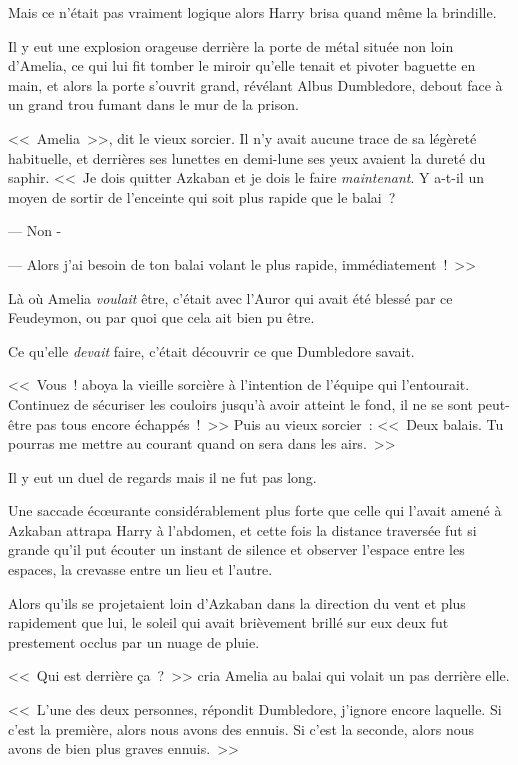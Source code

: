 Mais ce n'était pas vraiment logique alors Harry brisa quand même la brindille.

\later

Il y eut une explosion orageuse derrière la porte de métal située non loin d'Amelia, ce qui lui fit tomber le miroir qu'elle tenait et pivoter baguette en main, et alors la porte s'ouvrit grand, révélant Albus Dumbledore, debout face à un grand trou fumant dans le mur de la prison.

<<~Amelia~>>, dit le vieux sorcier. Il n'y avait aucune trace de sa légèreté habituelle, et derrières ses lunettes en demi-lune ses yeux avaient la dureté du saphir. <<~Je dois quitter Azkaban et je dois le faire \emph{maintenant}. Y a-t-il un moyen de sortir de l'enceinte qui soit plus rapide que le balai~?

--- Non -

--- Alors j'ai besoin de ton balai volant le plus rapide, immédiatement~!~>>

Là où Amelia \emph{voulait} être, c'était avec l'Auror qui avait été blessé par ce Feudeymon, ou par quoi que cela ait bien pu être.

Ce qu'elle \emph{devait} faire, c'était découvrir ce que Dumbledore savait.

<<~Vous~! aboya la vieille sorcière à l'intention de l'équipe qui l'entourait. Continuez de sécuriser les couloirs jusqu'à avoir atteint le fond, il ne se sont peut-être pas tous encore échappés~!~>> Puis au vieux sorcier~: <<~Deux balais. Tu pourras me mettre au courant quand on sera dans les airs.~>>

Il y eut un duel de regards mais il ne fut pas long.

\later

Une saccade écœurante considérablement plus forte que celle qui l'avait amené à Azkaban attrapa Harry à l'abdomen, et cette fois la distance traversée fut si grande qu'il put écouter un instant de silence et observer l'espace entre les espaces, la crevasse entre un lieu et l'autre.

\later

Alors qu'ils se projetaient loin d'Azkaban dans la direction du vent et plus rapidement que lui, le soleil qui avait brièvement brillé sur eux deux fut prestement occlus par un nuage de pluie.

<<~Qui est derrière ça~?~>> cria Amelia au balai qui volait un pas derrière elle.

<<~L'une des deux personnes, répondit Dumbledore, j'ignore encore laquelle. Si c'est la première, alors nous avons des ennuis. Si c'est la seconde, alors nous avons de bien plus graves ennuis.~>>

